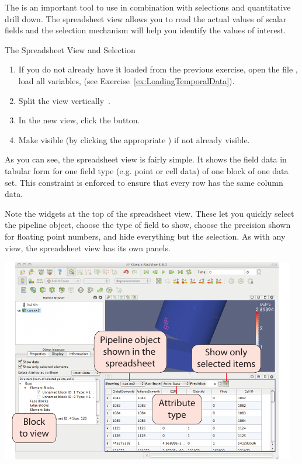 The  is an important tool to use in combination
with selections and quantitative drill down.  The spreadsheet view
allows you to read the actual values of scalar fields and the
selection mechanism will help you identify the values of interest.

\begin{exercise}{The Spreadsheet View and Selection}
  \label{ex:TheSpreadsheetViewAndSelection}%
  \begin{enumerate}
  \item If you do not already have it loaded from the previous exercise,
    open the file , load all variables, \apply (see
    Exercise~\ref{ex:LoadingTemporalData}).
  \item Split the view vertically~\splitViewV.
  \item In the new view, click the  button.
  \item Make  visible (by clicking the appropriate \eyeballg)
    if not already visible.
    \savecounter
  \end{enumerate}

  As you can see, the spreadsheet view is fairly simple.  It shows the
  field data in tabular form for one field type (e.g. point or cell data)
  of one block of one data set.  This constraint is enforced to ensure that
  every row has the same column data.

  Note the widgets at the top of the spreadsheet view.  These let you
  quickly select the pipeline object, choose the type of field to show,
  choose the precision shown for floating point numbers, and hide
  everything but the selection.  As with any view, the spreadsheet view has
  its own  panels.

  \begin{inlinefig}
    \includegraphics[scale=\bbscale]{images/SpreadsheetViewLabeled}
  \end{inlinefig}


\end{exercise}
